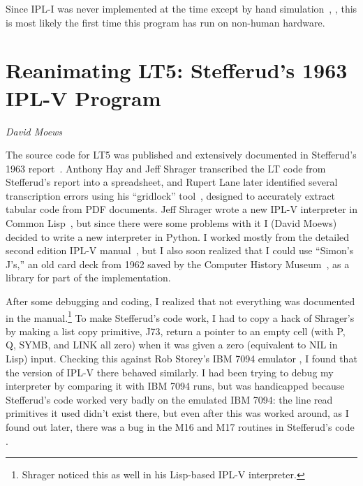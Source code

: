 \documentclass[journal]{IEEEtran}
\begin{document}
Since IPL-I was never implemented at the time except by hand
simulation~\cite[Ch.~13]{simon1996models}, \cite[p.~xx]{newell1964ipl}, this is most likely the first time this program has run on non-human hardware.


%
%

\section{Reanimating LT5: Stefferud's 1963 IPL-V Program}
\label{sec:lt5}

{\em David Moews}

%
%

The source code for LT5 was published and extensively documented
in Stefferud's 1963 report~\cite{stefferud1963lt}.  
Anthony Hay and Jeff Shrager transcribed the LT code from Stefferud's
report into a spreadsheet, and Rupert Lane later identified
several transcription errors using his ``gridlock''
tool~\cite{lane2024gridlock}, designed to accurately extract
tabular code from PDF documents.
Jeff Shrager wrote a new IPL-V interpreter in Common 
Lisp~\cite{shrager2026,shragerrepo}, but since there were some problems with
it I (David Moews) decided to write a new interpreter in Python.
I worked mostly from the detailed second edition IPL-V
manual~\cite{newell1964ipl}, but I also soon realized that I could use
``Simon's J's,'' an old card deck from 1962 saved by the Computer History
Museum~\cite{bochannek2012simonsjs}, as a library for part of the
implementation.

After some debugging and coding, I realized that not
everything was documented in the manual.\footnote{Shrager noticed this as well in his Lisp-based IPL-V interpreter.}
To make Stefferud's code work, I had to copy a hack of  
Shrager's by making a list copy primitive, J73, return a pointer
to an empty cell (with P, Q, SYMB, and LINK all zero) when it was given
a zero (equivalent to NIL in Lisp) input.  Checking this against Rob 
Storey's IBM 7094 emulator \cite{ibsys}, I found that the version of IPL-V there
behaved similarly.  I had been trying to debug my interpreter by comparing
it with IBM 7094 runs, but was handicapped because Stefferud's code
worked very badly on the emulated IBM 7094: the line read primitives
it used didn't exist there, but even after this was worked around,
as I found out later, there was a bug in the M16 and M17 routines
in Stefferud's code \cite{moewsrepo2}.
\end{document}
